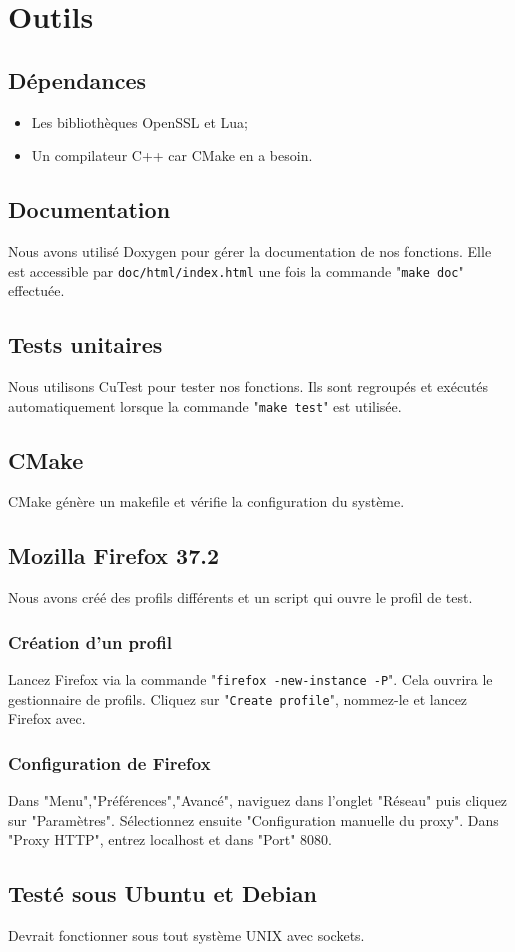 \section{Outils}
\subsection{Dépendances}
\begin{itemize}
\item Les bibliothèques OpenSSL et Lua;
\item Un compilateur C++ car CMake en a besoin.
\end{itemize}

\subsection{Documentation}
Nous avons utilisé Doxygen pour gérer la documentation de nos fonctions. Elle est accessible par \texttt{doc/html/index.html} une fois la commande "\texttt{make doc}" effectuée.

\subsection{Tests unitaires}
Nous utilisons CuTest pour tester nos fonctions. Ils sont regroupés et exécutés automatiquement lorsque la commande "\texttt{make test}" est utilisée.

\subsection{CMake}
CMake génère un makefile et vérifie la configuration du système.

\subsection{Mozilla Firefox 37.2}
Nous avons créé des profils différents et un script qui ouvre le profil de test.
\subsubsection{Création d'un profil}
Lancez Firefox via la commande "\texttt{firefox -new-instance -P}". Cela ouvrira le gestionnaire de profils. Cliquez sur "\texttt{Create profile}", nommez-le et lancez Firefox avec.
\subsubsection{Configuration de Firefox}
Dans "Menu","Préférences","Avancé", naviguez dans l'onglet "Réseau" puis cliquez sur "Paramètres". Sélectionnez ensuite "Configuration manuelle du proxy". Dans "Proxy HTTP", entrez localhost et dans "Port" 8080.

\subsection{Testé sous Ubuntu et Debian}
Devrait fonctionner sous tout système UNIX avec sockets.
